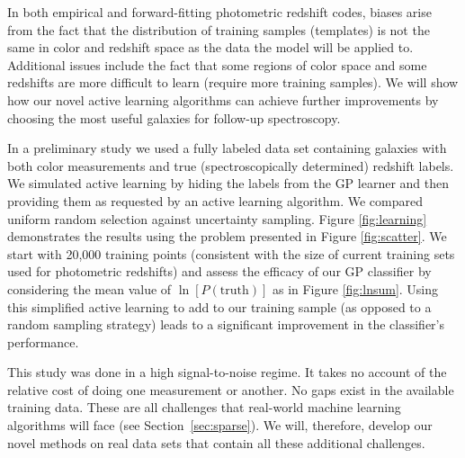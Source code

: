 \documentclass[prd,nofootbib,floatfix,11pt,tightenlines]{revtex4}
\begin{document}
In both empirical and forward-fitting photometric redshift codes, biases
arise from the fact that the distribution of training samples (templates)
is not the same in color and redshift space as the data the model will be
applied to.  Additional issues include the fact that some regions of color
space and some redshifts are more difficult to learn (require more training
samples).  We will show how our novel active learning algorithms can
achieve further improvements by choosing the most useful galaxies for
follow-up spectroscopy.

In a preliminary study we used a fully labeled data set containing galaxies
with both color measurements and true (spectroscopically determined)
redshift labels.  We simulated active learning by hiding the labels from
the GP learner and then providing them as requested by an active learning
algorithm.  We compared uniform random selection against uncertainty
sampling.  Figure \ref{fig:learning} demonstrates the results using the
problem presented in Figure \ref{fig:scatter}. %
We start with 20,000 training points (consistent with the size of
current training sets used for photometric redshifts) and assess the efficacy of our
GP classifier by considering the mean value of $\ln[P(\text{truth})]$ as in
Figure \ref{fig:lnsum}.  Using this simplified active learning to add
to our training sample (as opposed to a random sampling strategy) 
leads to a significant improvement in the classifier's performance.

This study was done in a high signal-to-noise regime.  It takes no account
of the relative cost of doing one measurement or another.  No gaps exist in
the available training data.  These are all challenges that real-world
machine learning algorithms will face (see Section~\ref{sec:sparse}).
We will, therefore, develop our novel
methods on real data sets that contain all these additional challenges.
\end{document}
